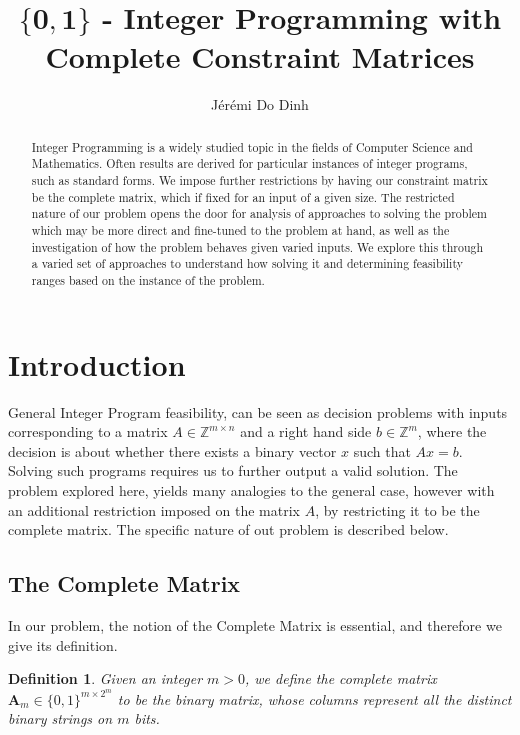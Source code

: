 \documentclass{article}
\title{$\mathbf{\{0,1\}}$ - Integer Programming with Complete Constraint Matrices}
\author{Jérémi Do Dinh}
\date{}
\newtheorem{definition}{Definition}
\begin{document}
\maketitle
\begin{abstract}
    Integer Programming is a widely studied topic in the fields of Computer Science  and Mathematics. Often results are derived for particular instances of integer programs, such as standard forms. We impose further restrictions by having our constraint matrix be the complete matrix, which if fixed for an input of a given size. The restricted nature of our problem opens the door for analysis of approaches to solving the problem which may be more direct and fine-tuned to the problem at hand, as well as the investigation of how the problem behaves given varied inputs. We explore this through a varied set of approaches to understand how solving it and determining feasibility ranges based on the instance of the problem.
\end{abstract}


\section{Introduction}
General Integer Program feasibility, can be seen as decision problems with inputs corresponding to a matrix $ A \in \mathbb{Z}^{m\times n} $ and a right hand side $ b \in \mathbb{Z}^m $, where the decision is about whether there exists a binary vector $ x $ such that $ Ax = b $. Solving such programs requires us to further output a valid solution. The problem explored here, yields many analogies to the general case, however with an additional restriction imposed on the matrix $ A $, by restricting it to be the complete matrix. The specific nature of out problem is described below.

\subsection{The Complete Matrix}
In our problem, the notion of the Complete Matrix is essential, and therefore we give its definition. 
\begin{adjustwidth}{10pt}{10pt}
	\begin{definition}
		Given an integer $m > 0$, we define the complete matrix $\mathbf{A}_m \in \{0, 1\}^{m \times 2^m}$ to be the binary matrix, whose columns represent all the distinct binary strings on $m$ bits. 
\end{definition}
\end{adjustwidth}
\end{document}
